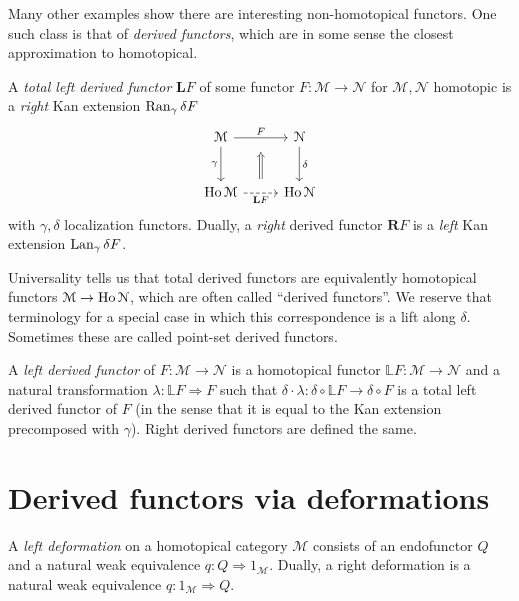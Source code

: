 Many other examples show there are interesting non-homotopical functors. One such class is that of \emph{derived functors}, which are in some sense the closest approximation to homotopical.

\begin{definition}\label{dfn:2.4}
	A \emph{total left derived functor} $\mathbf{L} F$ of some functor $F : \mathcal{M}  \to \mathcal{N} $ for $\mathcal{M} ,\mathcal{N} $ homotopic is a \emph{right} Kan extension $\operatorname{Ran}_\gamma\delta F$
	\[\begin{tikzcd}[row sep = 2.5em, column sep = 2.5em]
		\mathcal{M} \ar[" F "{name=F}, r] \ar[" \gamma "', d]  & \mathcal{N} \ar[" \delta ", d]  \\
	\Ho \mathcal{M} \ar[" \mathbf{L} F "'{name=LF}, dashed, r] & \Ho \mathcal{N} 
	\arrow[from=LF, to=F, shorten=10pt, Rightarrow] 
	\end{tikzcd}\]
	with $\gamma,\delta$ localization functors. Dually, a \emph{right} derived functor $\mathbf{R} F$ is a \emph{left} Kan extension $\operatorname{Lan}_\gamma\delta F$.
\end{definition}

Universality tells us that total derived functors are equivalently homotopical functors $\mathcal{M} \to \operatorname{Ho} \mathcal{N} $, which are often called ``derived functors''. We reserve that terminology for a special case in which this correspondence is a lift along $\delta$. Sometimes these are called point-set derived functors.

\begin{definition}\label{dfn:2.5}
	A \emph{left derived functor} of $F : \mathcal{M}  \to \mathcal{N} $ is a homotopical functor $\mathbb{L} F : \mathcal{M}  \to \mathcal{N} $ and a natural transformation $\lambda : \mathbb{L} F \Rightarrow F$ such that $\delta\cdot \lambda : \delta\circ \mathbb{L} F \to \delta \circ F$ is a total left derived functor of $F$ (in the sense that it is equal to the Kan extension precomposed with $\gamma$). Right derived functors are defined the same.
\end{definition}

\section{Derived functors via deformations}

\begin{definition}[Deformation]\label{dfn:2.6}
	A \emph{left deformation} on a homotopical category $\mathcal{M} $ consists of an endofunctor $Q$ and a natural weak equivalence $q : Q \Rightarrow 1_\mathcal{M} $. Dually, a right deformation is a natural weak equivalence $q : 1_\mathcal{M}  \Rightarrow Q$.
\end{definition}

